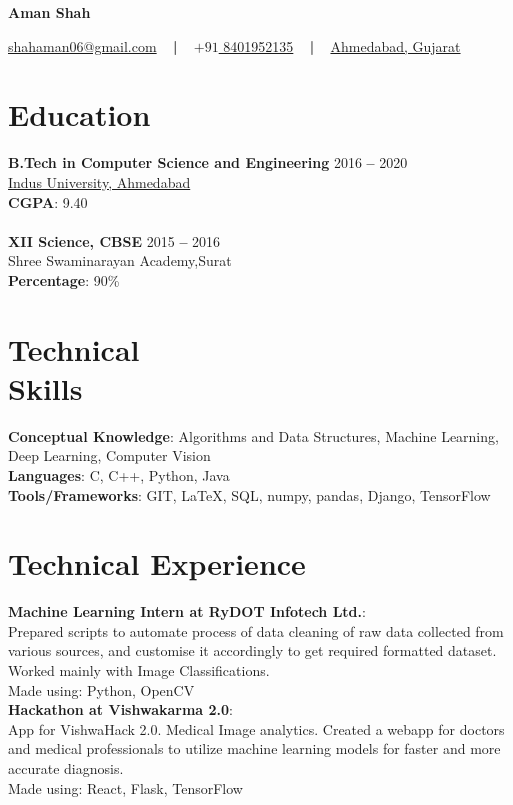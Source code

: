 \documentclass[margin, centered]{res}
\begin{document}
	\begin{center}
		\hspace{-\hoffset}
		\huge\textbf{Aman Shah}
	\end{center}
	\begin{center}
		\hspace{-\hoffset}
		\href{mailto:shahaman06@gmail.com}{shahaman06@gmail.com}
		~ \textbf{|} ~
		\href{tel:+918401952135}{\(+91\) 8401952135}
		~ \textbf{|} ~
		\href{https://goo.gl/maps/QqRrJzxewF82}{Ahmedabad, Gujarat}
	\end{center}

	\begin{resume}
		\section{Education}
			\textbf{B.Tech in Computer Science and Engineering} \hfill 2016 \textbf{--} 2020 \\
			\href{https://www.indusuni.ac.in/}{Indus University, Ahmedabad}\\
			\textbf{CGPA}: 9.40\\ %
			\\
			\textbf{XII Science, CBSE} \hfill 2015 \textbf{--} 2016 \\
			Shree Swaminarayan Academy,Surat \\
			\textbf{Percentage}: 90\%
		
		\section{Technical \\ Skills}
			\textbf{Conceptual Knowledge}: Algorithms and Data Structures, Machine Learning, \\Deep Learning, Computer Vision\\
			\textbf{Languages}: C, C++, Python, Java \\
			\textbf{Tools/Frameworks}: GIT, \LaTeX, SQL, numpy, pandas, Django, TensorFlow
		
		\section{Technical Experience}
			\textbf{Machine Learning Intern at RyDOT Infotech Ltd.}:\\
			Prepared scripts to automate process of data cleaning of raw data collected from \\various sources, and customise it accordingly to get required formatted dataset. Worked mainly with Image Classifications.\\
			Made using: Python, OpenCV\\
			\textbf{Hackathon at Vishwakarma 2.0}:\\
			App for VishwaHack 2.0. Medical Image analytics. Created a webapp for doctors and medical professionals to utilize machine learning models for faster and more accurate diagnosis.\\
			Made using: React, Flask, TensorFlow


\end{resume}
\end{document}
